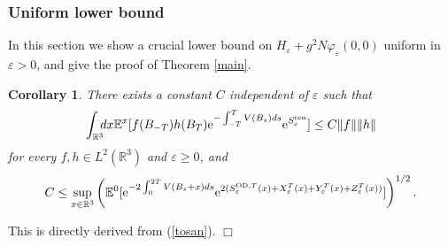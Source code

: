 \documentclass[11pt]{article}
\newtheorem{corollary}[theorem]{Corollary}
\providecommand{\bc}[1]{\begin{corollary}\label{#1}}
\providecommand{\ec}{\end{corollary}}
\providecommand{\idx}{\int_{\BR} \!\!\! dx}
\newcommand{\Ebb}{{\mathbb E}}
\providecommand{\eq}[1]{\begin{equation}\label{#1}}
\providecommand{\en}{\end{equation}}
\providecommand{\qed}{\hfill {$\Box$}\par\medskip}
\providecommand{\BR}{{\mathbb{R}^3 }}
\providecommand{\od}{{\rm OD}}
\providecommand{\kak}[1]{(\ref{#1})}
\providecommand{\LR}{{L^2(\BR)}}
\providecommand{\lk}{\left(}
\providecommand{\rk}{\right)}
\providecommand{\han}{{1/2}}
\providecommand{\e}{{\rm e}}
\providecommand{\1}{\mathbb{1}}
\providecommand{\eps}{\varepsilon}
\providecommand{\ren}{{\rm ren}}
\newcounter {constant}
\begin{document}
\subsubsection{Uniform lower bound}
\label{223}
In this section we show a crucial lower bound on $H_\eps+g^2 N \varphi_\eps(0,0)$ uniform in
$\eps>0$, and give the proof of Theorem \ref{main}.

\bc{map}
There exists a constant $C$ independent of $\eps$ such that
\eq{bound1}
\idx \Ebb^x[f(B_{-T})h(B_T) \e^{-\int_{-T}^TV(B_s) ds} \e^{S_\eps^\ren }]\leq C\|f\| \|h\|
\en
for every $f,h\in\LR$ and  $\eps\geq0$, and
\eq{tosan2}
C\leq \sup_{x\in\BR} 
\lk
\Ebb^0[\e^{-2\int_0^{2T}V(B_s+x) ds}
\e^{2(S_\eps^{\od, T}(x)+X_\eps^T(x)+Y_\eps^T(x)+Z_\eps^T(x))}]\rk^\han.
\en
\ec
\proof
This is directly derived from \kak{tosan}.
\qed
\end{document}
